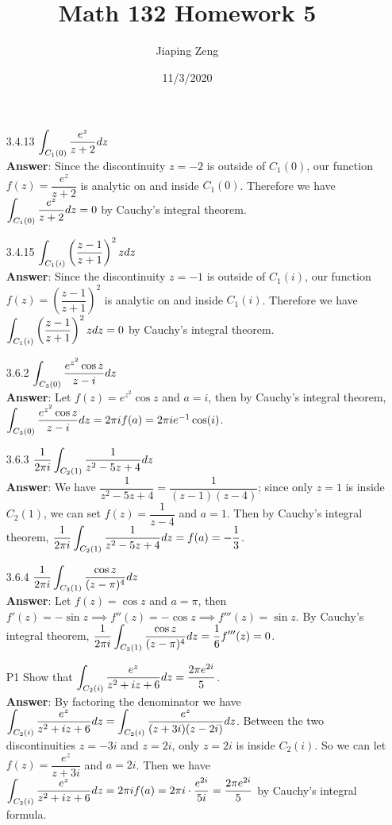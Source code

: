 \documentclass{article}
\title{Math 132 Homework 5}
\date{11/3/2020}
\author{Jiaping Zeng}
\begin{document}
\maketitle

\begin{itemize}
      \item [3.4.13] $\mathlarger{\int_{C_1(0)}\dfrac{e^z}{z+2}dz}$\\
            \textbf{Answer}: Since the discontinuity $z=-2$ is outside of $C_1(0)$, our function $f(z)=\dfrac{e^z}{z+2}$ is analytic on and inside $C_1(0)$. Therefore we have $\mathlarger{\int_{C_1(0)}\frac{e^z}{z+2}dz}=0$ by Cauchy's integral theorem.
      \item [3.4.15] $\mathlarger{\int_{C_1(i)}\left(\frac{z-1}{z+1}\right)^2zdz}$\\
            \textbf{Answer}: Since the discontinuity $z=-1$ is outside of $C_1(i)$, our function $f(z)=\left(\dfrac{z-1}{z+1}\right)^2$ is analytic on and inside $C_1(i)$. Therefore we have $\mathlarger{\int_{C_1(i)}\left(\frac{z-1}{z+1}\right)^2zdz}=0$ by Cauchy's integral theorem.
      \item [3.6.2] $\mathlarger{\int_{C_3(0)}\frac{e^{z^2}\cos z}{z-i}dz}$\\
            \textbf{Answer}: Let $f(z)=e^{z^2}\cos z$ and $a=i$, then by Cauchy's integral theorem, $\mathlarger{\int_{C_3(0)}\frac{e^{z^2}\cos z}{z-i}dz}=2\pi if(a)=2\pi ie^{-1}\cos(i)$.
      \item [3.6.3] $\mathlarger{\frac{1}{2\pi i}\int_{C_2(1)}\frac{1}{z^2-5z+4}dz}$\\
            \textbf{Answer}: We have $\dfrac{1}{z^2-5z+4}=\dfrac{1}{(z-1)(z-4)}$; since only $z=1$ is inside $C_2(1)$, we can set $f(z)=\dfrac{1}{z-4}$ and $a=1$. Then by Cauchy's integral theorem, $\mathlarger{\frac{1}{2\pi i}\int_{C_2(1)}\frac{1}{z^2-5z+4}dz=f(a)=-\dfrac{1}{3}}$.
      \item [3.6.4] $\mathlarger{\frac{1}{2\pi i}\int_{C_3(1)}\frac{\cos z}{(z-\pi)^4}dz}$\\
            \textbf{Answer}: Let $f(z)=\cos z$ and $a=\pi$, then $f'(z)=-\sin z\implies f''(z)=-\cos z\implies f'''(z)=\sin z$. By Cauchy's integral theorem, $\mathlarger{\frac{1}{2\pi i}\int_{C_3(1)}\frac{\cos z}{(z-\pi)^4}dz=\frac{1}{6}f'''(z)=0}$.
      \item [P1] Show that $\mathlarger{\int_{C_2(i)}\frac{e^z}{z^2+iz+6}dz=\frac{2\pi e^{2i}}{5}}$.\\
            \textbf{Answer}: By factoring the denominator we have $\mathlarger{\int_{C_2(i)}\frac{e^z}{z^2+iz+6}dz=\int_{C_2(i)}\frac{e^z}{(z+3i)(z-2i)}dz}$. Between the two discontinuities $z=-3i$ and $z=2i$, only $z=2i$ is inside $C_2(i)$. So we can let $f(z)=\dfrac{e^z}{z+3i}$ and $a=2i$. Then we have $\mathlarger{\int_{C_2(i)}\frac{e^z}{z^2+iz+6}dz=2\pi if(a)=2\pi i\cdot\frac{e^{2i}}{5i}=\frac{2\pi e^{2i}}{5}}$ by Cauchy's integral formula.

\end{itemize}
\end{document}
